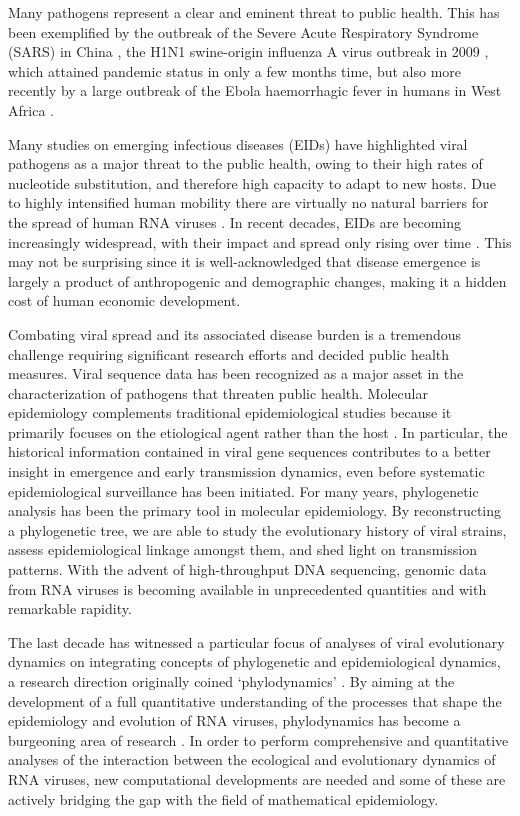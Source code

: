 Many pathogens represent a clear and eminent threat to public health. 
This has been exemplified by the outbreak of the Severe Acute Respiratory Syndrome (SARS) in China \citep{Ksiazek2003}, the H1N1 swine-origin influenza A virus outbreak in 2009 \citep{Fraser2009}, which attained pandemic status in only a few months time, but also more recently by a large outbreak of the Ebola haemorrhagic fever in humans in West Africa \citep{Dudas2014}. 

Many studies on emerging infectious diseases (EIDs) have highlighted viral pathogens as a major threat to the public health, owing to their high rates of nucleotide substitution, and therefore high capacity to adapt to new hosts. 
Due to highly intensified human mobility there are virtually no natural barriers for the spread of human RNA viruses \citep{Brockmann2006}.
In recent decades, EIDs are becoming increasingly widespread, with their impact and spread only rising over time \citep{Jones2008}.
This may not be surprising since it is well-acknowledged that disease emergence is largely a product of anthropogenic and demographic changes, making it a hidden cost of human economic development.
 
Combating viral spread and its associated disease burden is a tremendous challenge requiring significant research efforts and decided public health measures. 
Viral sequence data has been recognized as a major asset in the characterization of pathogens that threaten public health.
Molecular epidemiology complements traditional epidemiological studies because it primarily focuses on the etiological agent rather than the host \citep{Leitner2002}.
In particular, the historical information contained in viral gene sequences contributes to a better insight in emergence and early transmission dynamics, even before systematic epidemiological surveillance has been initiated. 
For many years, phylogenetic analysis has been the primary tool in molecular epidemiology. 
By reconstructing a phylogenetic tree, we are able to study the evolutionary history of viral strains, assess epidemiological linkage amongst them, and shed light on transmission patterns. 
With the advent of high-throughput DNA sequencing, genomic data from RNA viruses is becoming available in unprecedented quantities and with remarkable rapidity. 

The last decade has witnessed a particular focus of analyses of viral evolutionary dynamics on integrating concepts of phylogenetic and epidemiological dynamics, a research direction originally coined `phylodynamics' \citep{Grenfell2004}.
By aiming at the development of a full quantitative understanding of the processes that shape the epidemiology and evolution of RNA viruses, phylodynamics has become a burgeoning area of research \citep{Holmes2009}.
In order to perform comprehensive and quantitative analyses of the interaction between the ecological and evolutionary dynamics of RNA viruses, new computational developments are needed and some of these are actively bridging the gap with the field of mathematical epidemiology.

